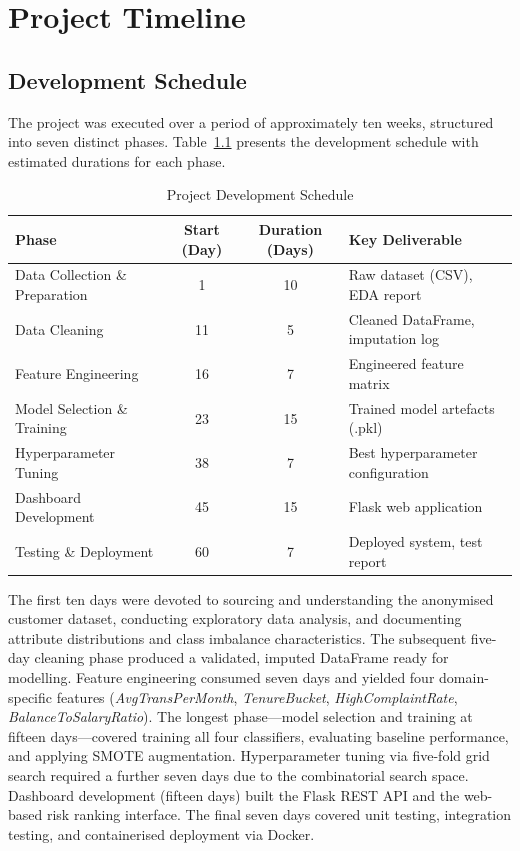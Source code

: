 \chapter{Project Timeline}

\section{Development Schedule}

The project was executed over a period of approximately ten weeks, structured into seven distinct phases. Table~\ref{tab:gantt} presents the development schedule with estimated durations for each phase.

\begin{table}[H]
\centering
\caption{Project Development Schedule}
\label{tab:gantt}
\begin{tabular}{|l|c|c|l|}
\hline
\textbf{Phase} & \textbf{Start (Day)} & \textbf{Duration (Days)} & \textbf{Key Deliverable} \\
\hline
Data Collection \& Preparation & 1  & 10 & Raw dataset (CSV), EDA report \\
\hline
Data Cleaning                  & 11 & 5  & Cleaned DataFrame, imputation log \\
\hline
Feature Engineering            & 16 & 7  & Engineered feature matrix \\
\hline
Model Selection \& Training    & 23 & 15 & Trained model artefacts (.pkl) \\
\hline
Hyperparameter Tuning          & 38 & 7  & Best hyperparameter configuration \\
\hline
Dashboard Development          & 45 & 15 & Flask web application \\
\hline
Testing \& Deployment          & 60 & 7  & Deployed system, test report \\
\hline
\end{tabular}
\end{table}

The first ten days were devoted to sourcing and understanding the anonymised customer dataset, conducting exploratory data analysis, and documenting attribute distributions and class imbalance characteristics. The subsequent five-day cleaning phase produced a validated, imputed DataFrame ready for modelling. Feature engineering consumed seven days and yielded four domain-specific features (\textit{AvgTransPerMonth}, \textit{TenureBucket}, \textit{HighComplaintRate}, \textit{BalanceToSalaryRatio}). The longest phase—model selection and training at fifteen days—covered training all four classifiers, evaluating baseline performance, and applying SMOTE augmentation. Hyperparameter tuning via five-fold grid search required a further seven days due to the combinatorial search space. Dashboard development (fifteen days) built the Flask REST API and the web-based risk ranking interface. The final seven days covered unit testing, integration testing, and containerised deployment via Docker.
